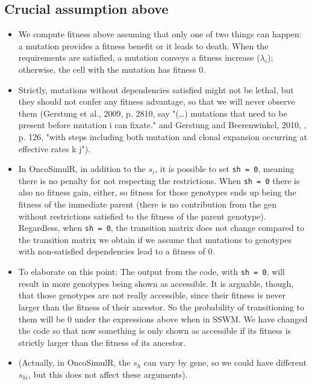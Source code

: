 \documentclass[11pt]{article}
\begin{document}
\subsection{Crucial assumption above}
\label{sec:org57fee67}
\begin{itemize}
\item We compute fitness above assuming that only one of two things can happen: a mutation provides a fitness benefit or it leads to death. When the requirements are satisfied, a mutation conveys a fitness increase (\(\lambda_i\)); otherwise, the cell with the mutation has fitness 0.

\item Strictly, mutations without dependencies satisfied might not be lethal, but they should not confer any fitness advantage, so that we will never observe them (Gerstung et al., 2009, p. 2810, say "(\ldots{}) mutations that need to be present before mutation i can fixate." and Gerstung and Beerenwinkel, 2010, , p. 126, "with steps including both mutation and clonal expansion occurring at effective rates k j").

\item In OncoSimulR, in addition to the \(s_i\), it is possible to set \texttt{sh = 0}, meaning there is no penalty for not respecting the restrictions. When \texttt{sh = 0} there is also no fitness gain, either, so fitness for those genotypes ends up being the fitness of the immediate parent (there is no contribution from the gen without restrictions satisfied to the fitness of the parent genotype). Regardless, when \texttt{sh = 0}, the transition matrix does not change compared to the transition matrix we obtain if we assume that mutations to genotypes with non-satisfied dependencies lead to a fitness of 0.
\end{itemize}


\begin{itemize}
\item To elaborate on this point: The output from the code, with \texttt{sh = 0}, will result in more genotypes being shown as accessible. It is arguable, though, that those genotypes are not really accessible, since their fitness is never larger than the fitness of their ancestor. So the probability of transitioning to them will be 0 under the expressions above when in SSWM. We have changed the code so that now something is only shown as accessible if its fitness is strictly larger than the fitness of its ancestor.

\item (Actually, in OncoSimulR, the \(s_h\) can vary by gene, so we could have different \(s_{hi}\), but this does not affect these arguments).
\end{itemize}
\end{document}
